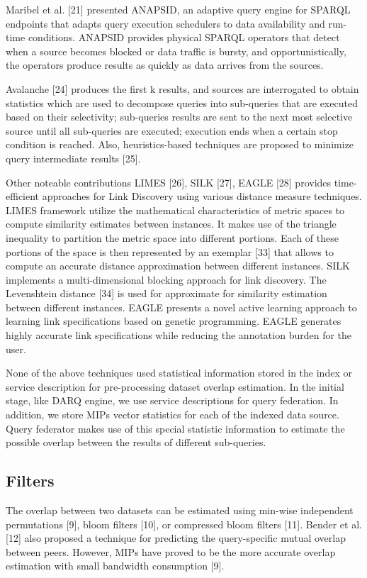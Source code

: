 \documentclass{sig-alternate}  %
\begin{document}
Maribel et al. {[}21{]} presented ANAPSID, an adaptive query engine
for SPARQL endpoints that adapts query execution schedulers to data
availability and run-time conditions. ANAPSID provides physical SPARQL
operators that detect when a source becomes blocked or data traffic
is bursty, and opportunistically, the operators produce results as
quickly as data arrives from the sources. 

Avalanche {[}24{]} produces the first k results, and sources are interrogated
to obtain statistics which are used to decompose queries into sub-queries
that are executed based on their selectivity; sub-queries results
are sent to the next most selective source until all sub-queries are
executed; execution ends when a certain stop condition is reached.
Also, heuristics-based techniques are proposed to minimize query intermediate
results {[}25{]}. 

Other noteable contributions LIMES {[}26{]}, SILK {[}27{]}, EAGLE
{[}28{]} provides time-efficient approaches for Link Discovery using
various distance measure techniques. LIMES framework utilize the mathematical
characteristics of metric spaces to compute similarity estimates between
instances. It makes use of the triangle inequality to partition the
metric space into different portions. Each of these portions of the
space is then represented by an exemplar {[}33{]} that allows to compute
an accurate distance approximation between different instances. SILK
implements a multi-dimensional blocking approach for link discovery.
The Levenshtein distance {[}34{]} is used for approximate for similarity
estimation between different instances. EAGLE presents a novel active
learning approach to learning link specifications based on genetic programming.
EAGLE generates highly accurate link specifications while reducing the
annotation burden for the user. 

None of the above techniques used statistical information stored in
the index or service description for pre-processing dataset overlap
estimation. In the initial stage, like DARQ engine, we use service
descriptions for query federation. In addition, we store MIPs vector
statistics for each of the indexed data source. Query federator makes
use of this special statistic information to estimate the possible
overlap between the results of different sub-queries.

\subsection{Filters}
The overlap between two datasets can be estimated using min-wise independent
permutations {[}9{]}, bloom filters {[}10{]}, or compressed bloom
filters {[}11{]}. Bender et al. {[}12{]} also proposed a technique
for predicting the query-specific mutual overlap between peers. However,
MIPs have proved to be the more accurate overlap estimation with small
bandwidth consumption {[}9{]}.
\end{document}
